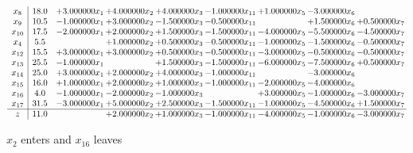 \documentclass[10pt]{article}
\begin{document}
 \[\begin{array}{c| c c@{\hskip 2pt} c@{\hskip 2pt} c@{\hskip 2pt} c@{\hskip 2pt} c@{\hskip 2pt} c@{\hskip 2pt} c@{\hskip 2pt} }
 x_{8}   &  18.0 & + 3.000000 x_{1} & + 4.000000 x_{2} & + 4.000000 x_{3} & -1.000000 x_{11} & + 1.000000 x_{5} & -3.000000 x_{6} &   \\
 x_{9}   &  10.5 & -1.000000 x_{1} & + 3.000000 x_{2} & -1.500000 x_{3} & -0.500000 x_{11} &   & + 1.500000 x_{6} & + 0.500000 x_{7}\\
 x_{10}   &  17.5 & -2.000000 x_{1} & + 2.000000 x_{2} & + 1.500000 x_{3} & -1.500000 x_{11} & -4.000000 x_{5} & -5.500000 x_{6} & -4.500000 x_{7}\\
 x_{4}   &  5.5  &   & + 1.000000 x_{2} & + 0.500000 x_{3} & -0.500000 x_{11} & -1.000000 x_{5} & -1.500000 x_{6} & -0.500000 x_{7}\\
 x_{12}   &  15.5 & + 3.000000 x_{1} & + 3.000000 x_{2} & + 0.500000 x_{3} & -0.500000 x_{11} & -3.000000 x_{5} & -0.500000 x_{6} & -0.500000 x_{7}\\
 x_{13}   &  25.5 & -1.000000 x_{1} &   & + 1.500000 x_{3} & -1.500000 x_{11} & -6.000000 x_{5} & -7.500000 x_{6} & + 0.500000 x_{7}\\
 x_{14}   &  25.0 & + 3.000000 x_{1} & + 2.000000 x_{2} & + 4.000000 x_{3} & -1.000000 x_{11} &   & -3.000000 x_{6} &   \\
 x_{15}   &  16.0 & + 1.000000 x_{1} & + 2.000000 x_{2} & + 1.000000 x_{3} & -1.000000 x_{11} & -2.000000 x_{5} & -4.000000 x_{6} &   \\
 x_{16}   &  4.0 & -1.000000 x_{1} & -2.000000 x_{2} & -1.000000 x_{3} &   & + 3.000000 x_{5} & -1.000000 x_{6} & -3.000000 x_{7}\\
 x_{17}   &  31.5 & -3.000000 x_{1} & + 5.000000 x_{2} & + 2.500000 x_{3} & -1.500000 x_{11} & -1.000000 x_{5} & -4.500000 x_{6} & + 1.500000 x_{7}\\
\hline
z    &  11.0  &   & + 2.000000 x_{2} & + 1.000000 x_{3} & -1.000000 x_{11} & -4.000000 x_{5} & -1.000000 x_{6} & -3.000000 x_{7}\\
\end{array}\]


 $ x_{2} $ enters and $ x_{16} $ leaves 
\end{document}
